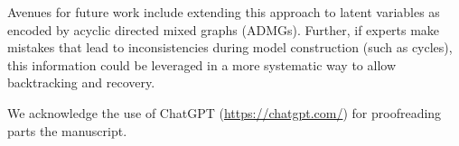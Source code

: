 \documentclass{uai2025} %
\begin{document}
Avenues for future work include extending this approach to latent variables 
as encoded by acyclic directed mixed graphs (ADMGs). Further, if experts make 
mistakes that lead to inconsistencies during model construction (such as cycles),
this information could be leveraged in a more systematic way to allow backtracking
and recovery.

\begin{acknowledgements} 
	We acknowledge the use of ChatGPT (\url{https://chatgpt.com/}) for
	proofreading parts the manuscript.
\end{acknowledgements}



\newpage


\end{document}
